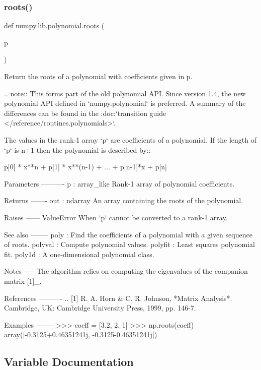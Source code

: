 \subsubsection{\texorpdfstring{roots()}{roots()}}
{\footnotesize\ttfamily def numpy.\+lib.\+polynomial.\+roots (\begin{DoxyParamCaption}\item[{}]{p }\end{DoxyParamCaption})}

\begin{DoxyVerb}Return the roots of a polynomial with coefficients given in p.

.. note::
   This forms part of the old polynomial API. Since version 1.4, the
   new polynomial API defined in `numpy.polynomial` is preferred.
   A summary of the differences can be found in the
   :doc:`transition guide </reference/routines.polynomials>`.

The values in the rank-1 array `p` are coefficients of a polynomial.
If the length of `p` is n+1 then the polynomial is described by::

  p[0] * x**n + p[1] * x**(n-1) + ... + p[n-1]*x + p[n]

Parameters
----------
p : array_like
    Rank-1 array of polynomial coefficients.

Returns
-------
out : ndarray
    An array containing the roots of the polynomial.

Raises
------
ValueError
    When `p` cannot be converted to a rank-1 array.

See also
--------
poly : Find the coefficients of a polynomial with a given sequence
       of roots.
polyval : Compute polynomial values.
polyfit : Least squares polynomial fit.
poly1d : A one-dimensional polynomial class.

Notes
-----
The algorithm relies on computing the eigenvalues of the
companion matrix [1]_.

References
----------
.. [1] R. A. Horn & C. R. Johnson, *Matrix Analysis*.  Cambridge, UK:
    Cambridge University Press, 1999, pp. 146-7.

Examples
--------
>>> coeff = [3.2, 2, 1]
>>> np.roots(coeff)
array([-0.3125+0.46351241j, -0.3125-0.46351241j])\end{DoxyVerb}
 

\subsection{Variable Documentation}
\mbox{\label{namespacenumpy_1_1lib_1_1polynomial_a81aa094e1e92d3709ccc61cd33748cdb}} 
